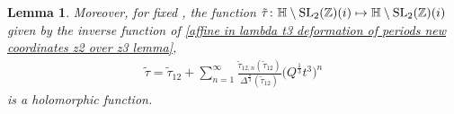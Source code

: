 \documentclass[pdftex]{sigma}
\numberwithin{equation}{section}
\newtheorem{Lemma}[Theorem]{Lemma}
\begin{document}
\begin{Lemma}
Moreover, for fixed , the function
$
\tilde\tau\colon \mathbb{H}\setminus{ {\rm SL}_2(\mathbb{Z})(i) } \mapsto \mathbb{H}\setminus{{\rm SL}_2(\mathbb{Z})(i)}
$
given by the inverse function of \eqref{affine in lambda t3 deformation of periods new coordinates z2 over z3 lemma},
\begin{gather}\label{affine in lambda t3 deformation of periods new coordinates z2 over z3 inverse lemma}
\tilde\tau=\tilde\tau_{12}+\sum_{n=1}^{\infty}\frac{\tilde\tau_{12,n}(\tilde\tau_{12})}{\Delta^{\frac{n}{3}}(\tilde\tau_{12})} \bigl( Q^{\frac{1}{3}}t^3\bigr)^n
\end{gather}
is a holomorphic function.



 \end{Lemma}
\end{document}
